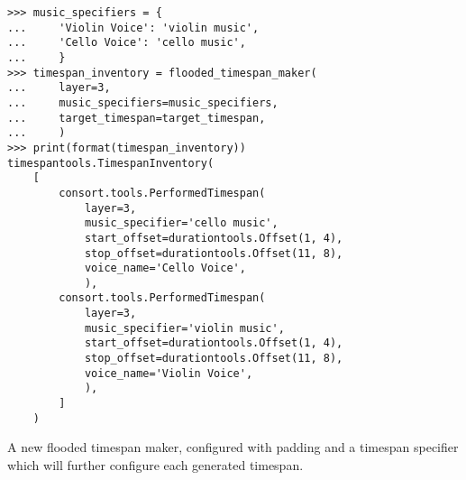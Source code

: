 \begin{singlespacing}
\vspace{-0.5\baselineskip}
\begin{lstlisting}
>>> music_specifiers = {
...     'Violin Voice': 'violin music',
...     'Cello Voice': 'cello music',
...     }
>>> timespan_inventory = flooded_timespan_maker(
...     layer=3,
...     music_specifiers=music_specifiers,
...     target_timespan=target_timespan,
...     )
>>> print(format(timespan_inventory))
timespantools.TimespanInventory(
    [
        consort.tools.PerformedTimespan(
            layer=3,
            music_specifier='cello music',
            start_offset=durationtools.Offset(1, 4),
            stop_offset=durationtools.Offset(11, 8),
            voice_name='Cello Voice',
            ),
        consort.tools.PerformedTimespan(
            layer=3,
            music_specifier='violin music',
            start_offset=durationtools.Offset(1, 4),
            stop_offset=durationtools.Offset(11, 8),
            voice_name='Violin Voice',
            ),
        ]
    )
\end{lstlisting}
\end{singlespacing}

A new flooded timespan maker, configured with padding and a timespan specifier
which will further configure each generated timespan.

\begin{comment}
<abjad>
flooded_timespan_maker = consort.FloodedTimespanMaker(
    padding=Duration(1, 4),
    timespan_specifier=consort.TimespanSpecifier(
        minimum_duration=Duration(1, 8),
        ),
    )
timespan_inventory = flooded_timespan_maker(
    layer=5,
    music_specifiers=music_specifiers,
    target_timespan=target_timespan,
    )
print(format(timespan_inventory))
</abjad>
\end{comment}

